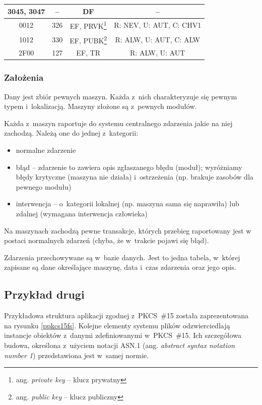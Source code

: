 \begin{table}
\begin{minipage}{.9\textwidth}
\begin{tabular}{c|c|c|c}
3045, 3047	    & --		   & DF		    & -- \\ \hline
0012		    & 326		   & EF, PRVK\footnote{ang. {\em private key} -- klucz prywatny} & R: NEV, U: AUT, C: CHV1 \\ \hline
1012		    & 330		   & EF, PUBK\footnote{ang. {\em public key} -- klucz publiczny} & R: ALW, U: AUT, C: ALW \\ \hline
2F00		    & 127		   & EF, TR		    & R: ALW, U: AUT \\
\end{tabular}
\end{minipage}
\end{table}

\subsubsection{Założenia}
Dany jest zbiór pewnych maszyn. Każda z~nich charakteryzuje się pewnym
typem i~lokalizacją. Maszyny złożone są z~pewnych modułów.

Każda z~maszyn raportuje do systemu centralnego zdarzenia jakie na niej
zachodzą. Należą one do jednej z~kategorii:
\begin{itemize}
\item normalne zdarzenie
\item błąd -- zdarzenie to zawiera opis zgłaszanego błędu (moduł);
wyróżniamy błędy krytyczne (maszyna nie działa) i~ostrzeżenia (np. brakuje
zasobów dla pewnego modułu)
\item interwencja -- o~kategorii lokalnej (np. maszyna sama się naprawiła)
lub zdalnej (wymagana interwencja człowieka)
\end{itemize}

Na maszynach zachodzą pewne transakcje, których przebieg raportowany jest w~
postaci normalnych zdarzeń (chyba, że w~trakcie pojawi się błąd).

Zdarzenia przechowywane są w~bazie danych. Jest to jedna tabela, w~której
zapisane są dane określające maszynę, data i~czas zdarzenia oraz jego opis.

\subsection{Przykład drugi}

Przykładowa struktura aplikacji zgodnej z~PKCS~\#15 została zaprezentowana
na rysunku \ref{ppkcs15fs}.
Kolejne elementy systemu plików odzwierciedlają instancje obiektów z~danymi
zdefiniowanymi w~PKCS~\#15. Ich szczegółowa budowa, określona z~użyciem
notacji ASN.1 (ang. {\em abstract syntax notation number 1})
przedstawiona jest w~samej normie.

